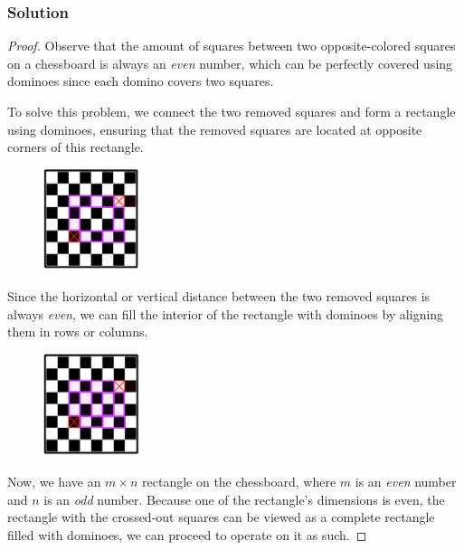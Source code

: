 \documentclass{article}
\begin{document}
\subsubsection*{Solution}

\begin{proof} Observe that the amount of squares between two opposite-colored squares on a chessboard is always an \textit{even} number, which can be perfectly covered using dominoes since each domino covers two squares.

To solve this problem, we connect the two removed squares and form a rectangle using dominoes, ensuring that the removed squares are located at opposite corners of this rectangle.

\begin{figure}[htbp] \centering \includegraphics[width=0.25\textwidth]{images/1.5.1.jpg}
\end{figure}

Since the horizontal or vertical distance between the two removed squares is always \textit{even}, we can fill the interior of the rectangle with dominoes by aligning them in rows or columns.

\begin{figure}[htbp] \centering \includegraphics[width=0.25\textwidth]{images/1.5.2.jpg} %
\end{figure}

\newpage

Now, we have an $m \times n$ rectangle on the chessboard, where $m$ is an \textit{even} number and $n$ is an \textit{odd} number. Because one of the rectangle’s dimensions is even, the rectangle with the crossed-out squares can be viewed as a complete rectangle filled with dominoes, we can proceed to operate on it as such.


\end{proof}
\end{document}
